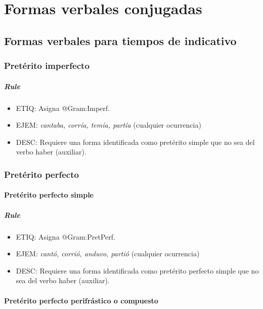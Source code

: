 \documentclass[11pt]{report}
\begin{document}
\chapter{Formas verbales conjugadas}
\section{Formas verbales para tiempos de indicativo}
\subsection{Pretérito imperfecto}
\paragraph*{Rule}
\begin{itemize}
\item ETIQ: Asigna @Gram:Imperf.
\item EJEM: \emph{cantaba, corría, temía, partía} (cualquier ocurrencia)
\item DESC: Requiere una forma identificada como pretérito simple que no sea del verbo haber (auxiliar).
\end{itemize}

\subsection{Pretérito perfecto}
\subsubsection{Pretérito perfecto simple}
\paragraph*{Rule}
\begin{itemize}
\item ETIQ: Asigna @Gram:PretPerf.
\item EJEM: \emph{cantó, corrió, anduvo, partió} (cualquier ocurrencia)
\item DESC: Requiere una forma identificada como pretérito perfecto simple que no sea del verbo haber (auxiliar).
\end{itemize}

\subsubsection{Pretérito perfecto perifrástico o compuesto}\label{sec:HaberAuxPretPerfecto}
\end{document}
